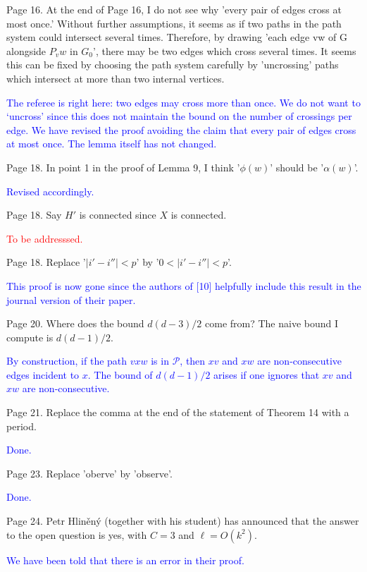 \documentclass[12pt]{article}
\newcommand{\done}{\textcolor{blue}{Done.}}
\newcommand{\changed}{\textcolor{blue}{Revised accordingly.}}
\newcommand{\tba}{\textcolor{red}{To be addresssed.}}
\begin{document}
Page 16.  At the end of Page 16, I do not see why 'every pair of edges
cross at most once.'  Without further assumptions, it seems as if two
paths in the path system could intersect several times.  Therefore, by
drawing 'each edge vw of G alongside $P_vw$ in $G_0$', there may be two
edges which cross several times.  It seems this can be fixed by
choosing the path system carefully by 'uncrossing' paths which
intersect at more than two internal vertices.

\textcolor{blue}{The referee is right here: two edges may cross more than once. We do not want to `uncross' since this does not maintain the bound on the number of crossings per edge. We have revised the proof avoiding the claim that every pair of edges cross at most once. The lemma itself has not changed.}

Page 18. In point 1 in the proof of Lemma 9, I think '$\phi(w)$' should
be '$\alpha(w)$'.

\changed

Page 18.  Say $H'$ is connected since $X$ is connected.

\tba

Page 18.  Replace '$|i'-i''| < p$' by  '$0< |i'-i''| < p$'.

\textcolor{blue}{This proof is now gone since the authors of [10] helpfully include this result in the journal version of their paper.}

Page 20.  Where does the bound $d(d-3)/2$ come from?  The naive bound I
compute is $d(d-1)/2$.

\textcolor{blue}{By construction, if the path $vxw$ is in $\mathcal{P}$, then $xv$ and $xw$ are non-consecutive edges incident to $x$. The bound of $d(d-1)/2$ arises if one ignores that $xv$ and $xw$ are non-consecutive.}


Page 21.  Replace the comma at the end of the statement of Theorem 14
with a period.

\done

Page 23. Replace 'oberve' by 'observe'.

\done

Page 24. Petr Hliněný (together with his student) has announced that
the answer to the open question is yes, with $C=3$ and $\ell=O(k^2)$.

\textcolor{blue}{We have been told that there is an error in their proof.}
\end{document}
